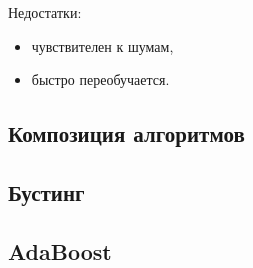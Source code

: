 Недостатки:
\begin{itemize}
    \item чувствителен к шумам,

    \item быстро переобучается.
\end{itemize}


\subsection{Композиция алгоритмов}

\subsection{Бустинг}

\subsection{AdaBoost}

\subsection{}

\subsection{}

\subsection{}


